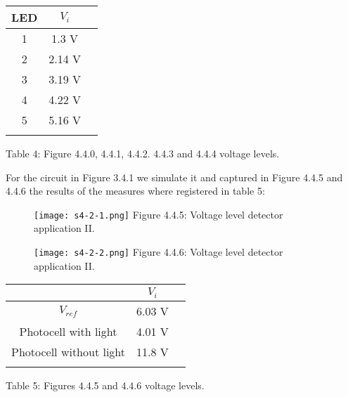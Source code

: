 \begin{center}
\begin{tabular}[.5cm]{c c c}
\toprule
\toprule
\hspace{100pt} LED \hspace{100pt} & \hspace{100pt} $V_{i}$ \hspace{100pt}  \\
\midrule
\midrule
1 & 1.3 V \\
\cmidrule{1-2}
2 & 2.14 V \\
\cmidrule{1-2}
3 & 3.19 V \\
\cmidrule{1-2}
4 & 4.22 V \\
\cmidrule{1-2}
5 & 5.16 V \\
\bottomrule
\linebreak
\end{tabular}
\linebreak Table 4: Figure 4.4.0, 4.4.1, 4.4.2. 4.4.3 and 4.4.4 voltage levels.
\end{center} \hfill

\pagebreak

For the circuit in Figure 3.4.1 we simulate it and captured in Figure 4.4.5 and 4.4.6 the results of the measures where registered in table 5:

\begin{figure}[H]
\texttt{[image: s4-2-1.png]}
\centering \linebreak \linebreak Figure 4.4.5: Voltage level detector application II.
\end{figure} \hfill

\begin{figure}[H]
\texttt{[image: s4-2-2.png]}
\centering \linebreak \linebreak Figure 4.4.6: Voltage level detector application II.
\end{figure} \hfill

\begin{center}
\begin{tabular}[.5cm]{c c c}
\toprule
\toprule
\hspace{200pt} & \hspace{100pt} $V_{i}$ \hspace{100pt}  \\
\midrule
\midrule
$V_{ref}$ & 6.03 V \\
\cmidrule{1-2}
Photocell with light & 4.01 V \\
\cmidrule{1-2}
Photocell without light & 11.8 V \\
\bottomrule
\linebreak
\end{tabular}
\linebreak Table 5: Figures 4.4.5  and 4.4.6 voltage levels.
\end{center} \hfill


\pagebreak